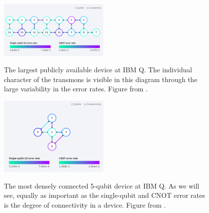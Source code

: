 \begin{figure}[h]
  \includegraphics[width=0.48\textwidth]{images/connection_diagram_melbourne.png}
  \label{melbourne_connections}
  \caption{The largest publicly available device at IBM Q. The individual
    character of the transmons is visible in this diagram through the large
    variability in the error rates. Figure from \cite{ibmq_16_melbourne}.}
\end{figure}


\begin{figure}[h]
  \includegraphics[width=0.48\textwidth]{images/connection_diagram_ibmqx2.png}
  \label{yorktown_connections}
  \caption{The most densely connected 5-qubit device at IBM Q. As we will see,
    equally as important as the single-qubit and CNOT error rates is the degree
    of connectivity in a device. Figure from \cite{ibmq_yorktown}.}
\end{figure}

